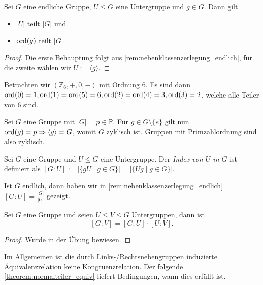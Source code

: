\begin{theorem}[Lagrange]
    Sei $G$ eine endliche Gruppe, $U \le G$ eine Untergruppe und $g \in G$. Dann gilt
    \begin{itemize}[topsep=0cm, label={--}]
        \item $\vert U \vert$ teilt $\vert G \vert$ und
        \item $\operatorname{ord}(g)$ teilt $\vert G \vert $.
    \end{itemize}
\end{theorem}
\begin{proof}
    Die erste Behauptung folgt aus \cref{rem:nebenklassenzerlegung_endlich}, für die zweite wählen wir $U := \langle g \rangle$.
\end{proof}

\begin{example}
    Betrachten wir $(\mathbb{Z}_6, +, 0, -)$ mit Ordnung 6. Es sind dann $\operatorname{ord}(0) = 1, \operatorname{ord}(1) = \operatorname{ord}(5) = 6, \operatorname{ord}(2) = \operatorname{ord}(4) = 3, \operatorname{ord}(3) = 2$, welche alle Teiler von 6 sind.

    Sei $G$ eine Gruppe mit $\vert G \vert = p \in \mathbb{P}$. Für $g \in G\setminus\{e\}$ gilt nun $\operatorname{ord}(g) = p \Rightarrow \langle g \rangle = G$, womit $G$ zyklisch ist. Gruppen mit Primzahlordnung sind also zyklisch.
\end{example}

\begin{definition}
    Sei $G$ eine Gruppe und $U \le G$ eine Untergruppe. Der \emph{Index von $U$ in $G$} ist definiert als $[G:U] := \vert \{gU \mid g \in G\}\vert = \vert \{Ug \mid g \in G\}\vert$. 
\end{definition}

\begin{remark}
    Ist $G$ endlich, dann haben wir in \cref{rem:nebenklassenzerlegung_endlich} $[G:U] = \frac{\vert G \vert}{\vert U \vert}$ gezeigt.
\end{remark}

\begin{theorem}[Indexsatz]
    Sei $G$ eine Gruppe und seien $U \le V \le G$ Untergruppen, dann ist $$[G:V] = [G:U] \cdot [U:V].$$ 
\end{theorem}
\begin{proof}
    Wurde in der Übung bewiesen.
\end{proof}

Im Allgemeinen ist die durch Links-/Rechtsnebengruppen induzierte Äquivalenzrelation keine Kongruenzrelation. Der folgende \cref{theorem:normalteiler_equiv} liefert Bedingungen, wann dies erfüllt ist.

